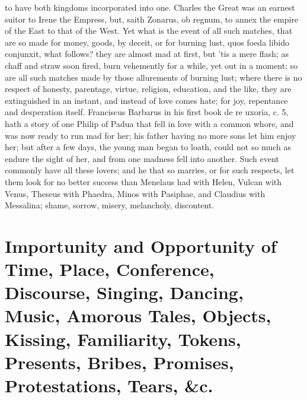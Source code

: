 to have both kingdoms incorporated into one. Charles the Great was an
earnest suitor to Irene the Empress, but, saith Zonarus, ob
regnum, to annex the empire of the East to that of the West. Yet what
is the event of all such matches, that are so made for money, goods, by
deceit, or for burning lust, quos foeda libido conjunxit, what follows?
they are almost mad at first, but 'tis a mere flash; as chaff and straw
soon fired, burn vehemently for a while, yet out in a moment; so are
all such matches made by those allurements of burning lust; where there
is no respect of honesty, parentage, virtue, religion, education, and
the like, they are extinguished in an instant, and instead of love
comes hate; for joy, repentance and desperation itself. Franciscus
Barbarus in his first book de re uxoria, c. 5, hath a story of one
Philip of Padua that fell in love with a common whore, and was now
ready to run mad for her; his father having no more sons let him enjoy
her; but after a few days, the young man began to loath, could
not so much as endure the sight of her, and from one madness fell into
another. Such event commonly have all these lovers; and he that so
marries, or for such respects, let them look for no better success than
Menelaus had with Helen, Vulcan with Venus, Theseus with Phaedra, Minos
with Pasiphae, and Claudius with Messalina; shame, sorrow, misery,
melancholy, discontent.

\section[Importunity and Opportunity of Time, Place\ldots{}]{Importunity and Opportunity of Time, Place, Conference, Discourse, Singing, Dancing, Music, Amorous Tales, Objects, Kissing, Familiarity, Tokens, Presents, Bribes, Promises, Protestations, Tears, \&c.}

